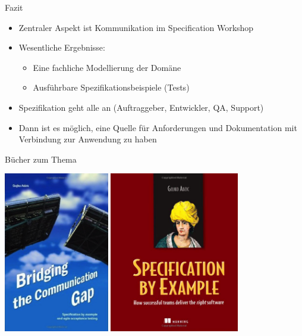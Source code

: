 \begin{frame}{Fazit}

\begin{itemize}
	\item Zentraler Aspekt ist Kommunikation im Specification Workshop
	\item Wesentliche Ergebnisse:
	\begin{itemize}
		\item Eine fachliche Modellierung der Domäne
		\item Ausführbare Spezifikationsbeispiele (Tests)
	\end{itemize}
	\item Spezifikation geht alle an (Auftraggeber, Entwickler, QA, Support)
	\item Dann ist es möglich, eine Quelle für Anforderungen und Dokumentation mit Verbindung zur Anwendung zu haben
\end{itemize}

\end{frame}

\begin{frame}{Bücher zum Thema}

\begin{center}
\includegraphics[height=7cm]{CommunicationGap.png}
\hfill
\includegraphics[height=7cm]{SpecificationByExample.png}
\end{center}

\end{frame}

